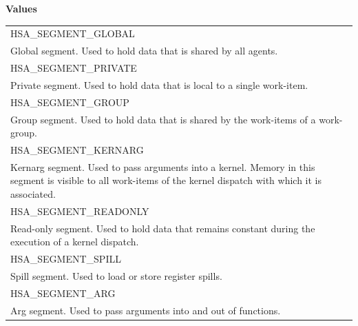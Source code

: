 \documentclass[final,oneside]{book}
\newcommand{\reftyp}[1]{#1}
\newcommand{\refenu}[1]{\reftyp{#1}}
\begin{document}
\noindent\textbf{Values}\\[-5mm]
\begin{longtable}{@{\hspace{2em}}p{\linewidth-2em}}
\hspace{-2em}\refenu{HSA_\-SEGMENT_\-GLOBAL}\\Global segment. Used to hold data that is shared by all agents.\\[2mm]
\hspace{-2em}\refenu{HSA_\-SEGMENT_\-PRIVATE}\\Private segment. Used to hold data that is local to a single work-item.\\[2mm]
\hspace{-2em}\refenu{HSA_\-SEGMENT_\-GROUP}\\Group segment. Used to hold data that is shared by the work-items of a work-group.\\[2mm]
\hspace{-2em}\refenu{HSA_\-SEGMENT_\-KERNARG}\\Kernarg segment. Used to pass arguments into a kernel. Memory in this segment is visible to all work-items of the kernel dispatch with which it is associated.\\[2mm]
\hspace{-2em}\refenu{HSA_\-SEGMENT_\-READONLY}\\Read-only segment. Used to hold data that remains constant during the execution of a kernel dispatch.\\[2mm]
\hspace{-2em}\refenu{HSA_\-SEGMENT_\-SPILL}\\Spill segment. Used to load or store register spills.\\[2mm]
\hspace{-2em}\refenu{HSA_\-SEGMENT_\-ARG}\\Arg segment. Used to pass arguments into and out of functions.
\end{longtable}
\end{document}
